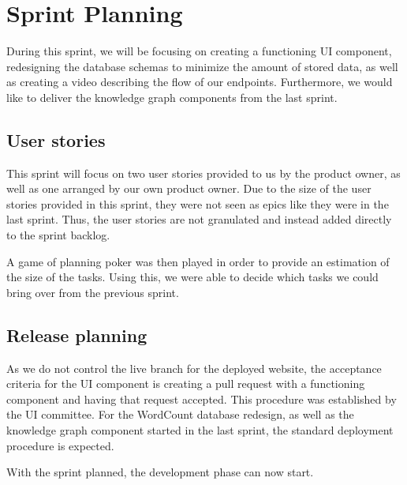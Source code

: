\section{Sprint Planning}
During this sprint, we will be focusing on creating a functioning UI component, redesigning the database schemas to minimize the amount of stored data, as well as creating a video describing the flow of our endpoints. Furthermore, we would like to deliver the knowledge graph components from the last sprint. 

\subsection*{User stories}
This sprint will focus on two user stories provided to us by the \knox{} product owner, as well as one arranged by our own product owner. 
Due to the size of the user stories provided in this sprint, they were not seen as epics like they were in the last sprint. Thus, the user stories are not granulated and instead added directly to the sprint backlog.  


A game of planning poker was then played in order to provide an estimation of the size of the tasks. 
Using this, we were able to decide which tasks we could bring over from the previous sprint.

\subsection*{Release planning}
As we do not control the live branch for the deployed \knox{} website, the acceptance criteria for the UI component is creating a pull request with a functioning component and having that request accepted.
This procedure was established by the UI committee. 
For the WordCount database redesign, as well as the knowledge graph component started in the last sprint, the standard deployment procedure is expected. 

With the sprint planned, the development phase can now start.
